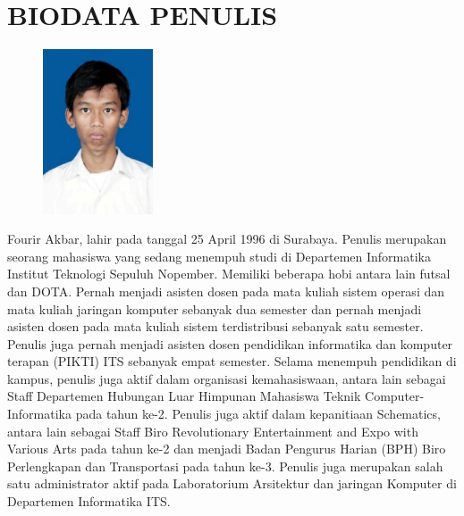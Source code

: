 	\chapter{BIODATA PENULIS}
		\begin{figure}
			\includegraphics[width=0.29\textwidth]{images/cover/pic}
		\end{figure}
		Fourir Akbar, lahir pada tanggal 25 April 1996 di Surabaya. Penulis merupakan seorang mahasiswa yang sedang menempuh studi di Departemen Informatika Institut Teknologi Sepuluh Nopember. Memiliki beberapa hobi antara lain futsal dan DOTA. Pernah menjadi asisten dosen pada mata kuliah sistem operasi dan mata kuliah jaringan komputer sebanyak dua semester dan pernah menjadi asisten dosen pada mata kuliah sistem terdistribusi sebanyak satu semester. Penulis juga pernah menjadi asisten dosen pendidikan informatika dan komputer terapan (PIKTI) ITS sebanyak empat semester. Selama menempuh pendidikan di kampus, penulis juga aktif dalam organisasi kemahasiswaan, antara lain sebagai Staff Departemen Hubungan Luar Himpunan Mahasiswa Teknik Computer-Informatika pada tahun ke-2. Penulis juga aktif dalam kepanitiaan Schematics, antara lain sebagai Staff Biro Revolutionary Entertainment and Expo with Various Arts pada tahun ke-2 dan menjadi Badan Pengurus Harian (BPH) Biro Perlengkapan dan Transportasi pada tahun ke-3. Penulis juga merupakan salah satu administrator aktif pada Laboratorium Arsitektur dan jaringan Komputer di Departemen Informatika ITS.
